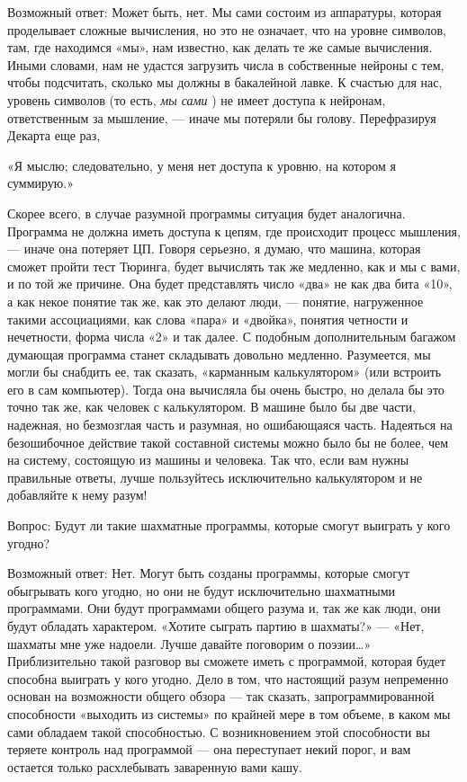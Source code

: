 \documentclass[../main.tex]{subfiles}
\begin{document}
Возможный ответ: Может быть, нет. Мы сами состоим из аппаратуры, которая проделывает сложные вычисления, но это не означает, что на уровне символов, там, где находимся «мы», нам известно, как делать те же самые вычисления. Иными словами, нам не удастся загрузить числа в собственные нейроны с тем, чтобы подсчитать, сколько мы должны в бакалейной лавке. К счастью для нас, уровень символов (то есть, \emph{мы сами} ) не имеет доступа к нейронам, ответственным за мышление, --- иначе мы потеряли бы голову. Перефразируя Декарта еще раз,

«Я мыслю; следовательно, у меня нет доступа к уровню, на котором я суммирую.»

Скорее всего, в случае разумной программы ситуация будет аналогична. Программа не должна иметь доступа к цепям, где происходит процесс мышления, --- иначе она потеряет ЦП. Говоря серьезно, я думаю, что машина, которая сможет пройти тест Тюринга, будет вычислять так же медленно, как и мы с вами, и по той же причине. Она будет представлять число «два» не как два бита «10», а как некое понятие так же, как это делают люди, --- понятие, нагруженное такими ассоциациями, как слова «пара» и «двойка», понятия четности и нечетности, форма числа «2» и так далее. С подобным дополнительным багажом думающая программа станет складывать довольно медленно. Разумеется, мы могли бы снабдить ее, так сказать, «карманным калькулятором» (или встроить его в сам компьютер). Тогда она вычисляла бы очень быстро, но делала бы это точно так же, как человек с калькулятором. В машине было бы две части, надежная, но безмозглая часть и разумная, но ошибающаяся часть. Надеяться на безошибочное действие такой составной системы можно было бы не более, чем на систему, состоящую из машины и человека. Так что, если вам нужны правильные ответы, лучше пользуйтесь исключительно калькулятором и не добавляйте к нему разум!

Вопрос: Будут ли такие шахматные программы, которые смогут выиграть у кого угодно?

Возможный ответ: Нет. Могут быть созданы программы, которые смогут обыгрывать кого угодно, но они не будут исключительно шахматными программами. Они будут программами общего разума и, так же как люди, они будут обладать характером. «Хотите сыграть партию в шахматы?» --- «Нет, шахматы мне уже надоели. Лучше давайте поговорим о поэзии\ldots» Приблизительно такой разговор вы сможете иметь с программой, которая будет способна выиграть у кого угодно. Дело в том, что настоящий разум непременно основан на возможности общего обзора --- так сказать, запрограммированной способности «выходить из системы» по крайней мере в том объеме, в каком мы сами обладаем такой способностью. С возникновением этой способности вы теряете контроль над программой --- она переступает некий порог, и вам остается только расхлебывать заваренную вами кашу.
\end{document}
